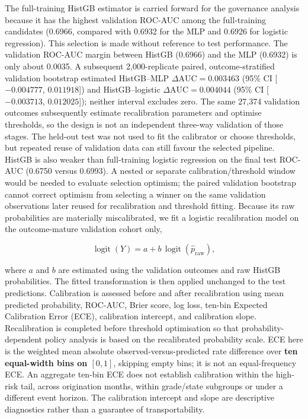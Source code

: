 \documentclass[10pt]{article}
\begin{document}
The full-training HistGB estimator is carried forward for the governance analysis because it has the highest validation ROC-AUC among the full-training candidates (0.6966, compared with 0.6932 for the MLP and 0.6926 for logistic regression). This selection is made without reference to test performance. The validation ROC-AUC margin between HistGB (0.6966) and the MLP (0.6932) is only about 0.0035. A subsequent 2,000-replicate paired, outcome-stratified validation bootstrap estimated HistGB--MLP $\Delta\mathrm{AUC}=0.003463$ (95\% CI [$-0.004777$, $0.011918$]) and HistGB--logistic $\Delta\mathrm{AUC}=0.004044$ (95\% CI [$-0.003713$, $0.012025$]); neither interval excludes zero. The same 27,374 validation outcomes subsequently estimate recalibration parameters and optimise thresholds, so the design is not an independent three-way validation of those stages. The held-out test was not used to fit the calibrator or choose thresholds, but repeated reuse of validation data can still favour the selected pipeline. HistGB is also weaker than full-training logistic regression on the final test ROC-AUC (0.6750 versus 0.6993). A nested or separate calibration/threshold window would be needed to evaluate selection optimism; the paired validation bootstrap cannot correct optimism from selecting a winner on the same validation observations later reused for recalibration and threshold fitting. Because its raw probabilities are materially miscalibrated, we fit a logistic recalibration model on the outcome-mature validation cohort only,

\[
\operatorname{logit}(Y)=a+b\,\operatorname{logit}(\hat p_{\mathrm{raw}}),
\]

where $a$ and $b$ are estimated using the validation outcomes and raw HistGB probabilities. The fitted transformation is then applied unchanged to the test predictions. Calibration is assessed before and after recalibration using mean predicted probability, ROC-AUC, Brier score, log loss, ten-bin Expected Calibration Error (ECE), calibration intercept, and calibration slope. Recalibration is completed before threshold optimisation so that probability-dependent policy analysis is based on the recalibrated probability scale. ECE here is the weighted mean absolute observed-versus-predicted rate difference over \textbf{ten equal-width bins on $[0,1]$}, skipping empty bins; it is not an equal-frequency ECE. An aggregate ten-bin ECE does not establish calibration within the high-risk tail, across origination months, within grade/state subgroups or under a different event horizon. The calibration intercept and slope are descriptive diagnostics rather than a guarantee of transportability.
\end{document}
